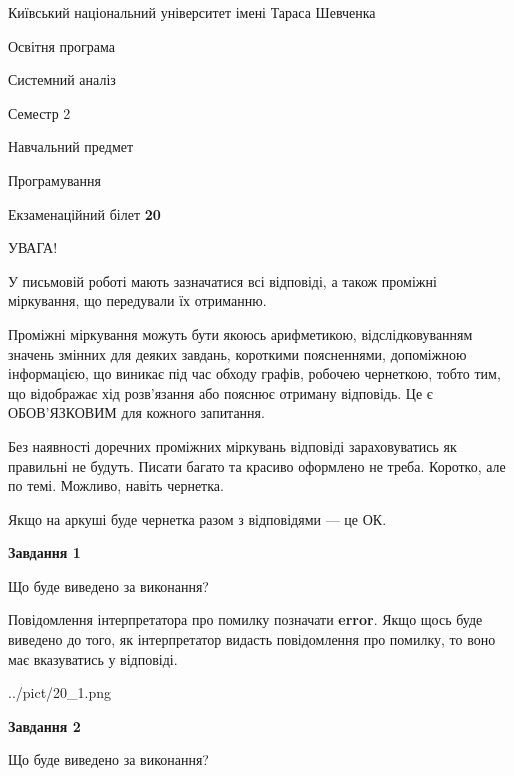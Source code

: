 \documentclass[12pt, ukrainian]{article}
\begin{document}
{{\begin {small}\par
{ \center  Київський національний університет імені Тараса Шевченка \par}
{\parbox {5 cm}{Освітня програма \hfill}{\parbox {7 cm}{Системний аналіз \hfill}}\parbox {6 cm}{\hfill Семестр 2}}\par
{\parbox {5 cm} {Навчальний предмет \hfill}\parbox {7 cm}{Програмування \hfill}\parbox {6cm}{\hfill}\par}\vspace{-7pt} \end{small}}{\center Екзаменаційний білет \No \textbf
{ 20 }\par}}
{
\begin {large}
УВАГА!

У письмовій роботі мають зазначатися всі відповіді, а також проміжні міркування, що передували їх отриманню.

Проміжні міркування можуть бути якоюсь арифметикою, відслідковуванням зна\-чень змінних для деяких завдань,
короткими поясненнями, допоміжною інформацією, що виникає під час обходу графів, робочею чернеткою,
тобто тим, що відображає хід розв’язання або пояснює отриману відповідь.
Це є ОБОВ’ЯЗКОВИМ для кожного запитання.

Без наявності доречних проміжних міркувань відповіді зараховуватись як правиль\-ні не будуть.
Писати багато та красиво оформлено не треба. Коротко, але по темі. Можли\-во, навіть чернетка.

Якщо на аркуші буде чернетка разом з відповідями --- це ОК.

\newpage

{\begin {center}\textbf{Завдання 1}\end {center}}\par
Що буде виведено за виконання?

Повідомлення інтерпретатора про помилку позначати \textbf{error}.
Якщо щось буде виведено до того, як інтерпретатор видасть повідомлення про помилку, 
то воно має вказуватись у відповіді. \par


\begin{center}
	{../pict/20_1.png}
\end{center}
\newpage

{\begin {center}\textbf{Завдання 2}\end {center}}\par
Що буде виведено за виконання?


\end{large}}
\end{document}
